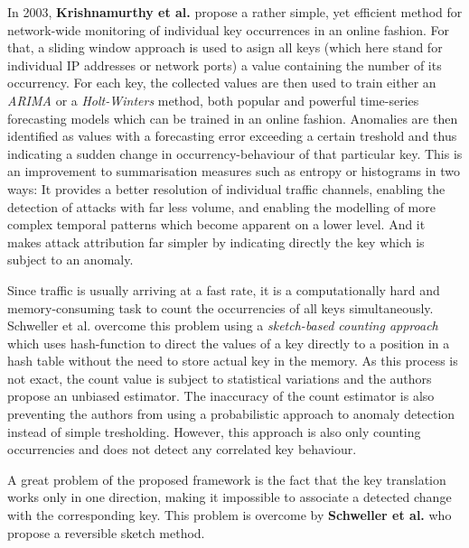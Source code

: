 \documentclass[a4paper,12pt,twoside]{report}
\begin{document}
In 2003, \textbf{Krishnamurthy et al.} \cite{krishnamurthy2003sketch} propose a rather simple, yet efficient method for network-wide monitoring of individual key occurrences in an online fashion. For that, a sliding window approach is used to asign all keys (which here stand for individual IP addresses or network ports) a value containing the number of its occurrency. For each key, the collected values are then used to train either an \textit{ARIMA} or a \textit{Holt-Winters} method, both popular and powerful time-series forecasting models which can be trained in an online fashion. Anomalies are then identified as values with a forecasting error exceeding a certain treshold and thus indicating a sudden change in occurrency-behaviour of that particular key. This is an improvement to summarisation measures such as entropy or histograms in two ways: It provides a better resolution of individual traffic channels, enabling the detection of attacks with far less volume, and enabling the modelling of more complex temporal patterns which become apparent on a lower level. And it makes attack attribution far simpler by indicating directly the key which is subject to an anomaly. 

Since traffic is usually arriving at a fast rate, it is a computationally hard and memory-consuming task to count the occurrencies of all keys simultaneously. Schweller et al.  overcome this problem using a \textit{sketch-based counting approach} which uses hash-function to direct the values of a key directly to a position in a hash table without the need to store actual key in the memory. As this process is not exact, the count value is subject to statistical variations and the authors propose an unbiased estimator. The inaccuracy of the count estimator is also preventing the authors from using a probabilistic approach to anomaly detection instead of simple tresholding. However, this approach is also only counting occurrencies and does not detect any correlated key behaviour.

A great problem of the proposed framework is the fact that the key translation works only in one direction, making it impossible to associate a detected change with the corresponding key. This problem is overcome by \textbf{Schweller et al.} \cite{schweller2004reversible} who propose a reversible sketch method.
\end{document}
